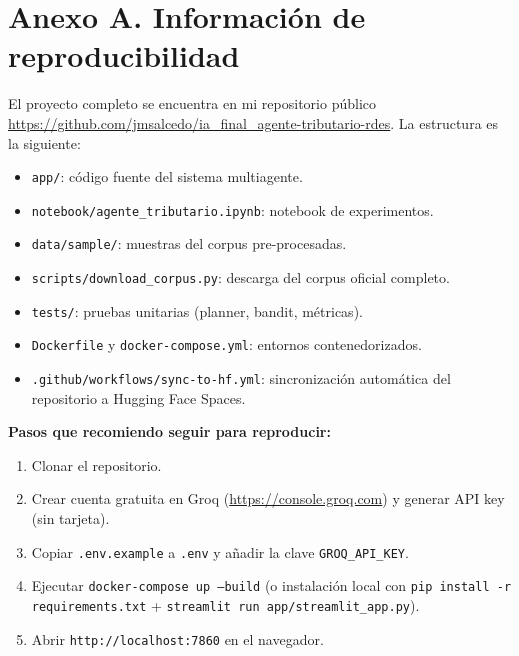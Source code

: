 \documentclass[11pt,a4paper]{article}
\begin{document}
\renewcommand{\refname}{Referencias}


\appendix
\section*{Anexo A. Información de reproducibilidad}

El proyecto completo se encuentra en mi repositorio público \url{https://github.com/jmsalcedo/ia_final_agente-tributario-rdes}. La estructura es la siguiente:

\begin{itemize}
  \item \texttt{app/}: código fuente del sistema multiagente.
  \item \texttt{notebook/agente\_tributario.ipynb}: notebook de experimentos.
  \item \texttt{data/sample/}: muestras del corpus pre-procesadas.
  \item \texttt{scripts/download\_corpus.py}: descarga del corpus oficial completo.
  \item \texttt{tests/}: pruebas unitarias (planner, bandit, métricas).
  \item \texttt{Dockerfile} y \texttt{docker-compose.yml}: entornos contenedorizados.
  \item \texttt{.github/workflows/sync-to-hf.yml}: sincronización automática del repositorio a Hugging Face Spaces.
\end{itemize}

\textbf{Pasos que recomiendo seguir para reproducir:}
\begin{enumerate}
  \item Clonar el repositorio.
  \item Crear cuenta gratuita en Groq (\url{https://console.groq.com}) y generar API key (sin tarjeta).
  \item Copiar \texttt{.env.example} a \texttt{.env} y añadir la clave \texttt{GROQ\_API\_KEY}.
  \item Ejecutar \texttt{docker-compose up --build} (o instalación local con \texttt{pip install -r requirements.txt} + \texttt{streamlit run app/streamlit\_app.py}).
  \item Abrir \texttt{http://localhost:7860} en el navegador.
\end{enumerate}
\end{document}
